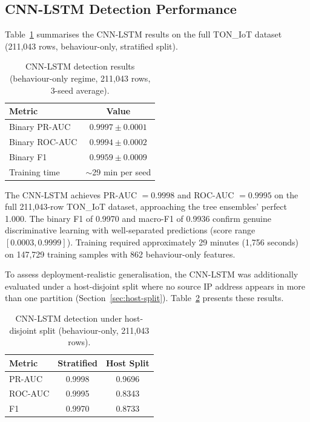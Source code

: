 \documentclass[12pt,a4paper]{report}
\begin{document}
\subsection{CNN-LSTM Detection Performance}
\label{sec:cnnlstm-detection}

Table~\ref{tab:cnnlstm} summarises the CNN-LSTM results on the full TON\_IoT dataset (211,043 rows, behaviour-only, stratified split).

\begin{table}[H]
\centering
\caption{CNN-LSTM detection results (behaviour-only regime, 211,043 rows, 3-seed average).}
\label{tab:cnnlstm}
\begin{tabular}{lc}
\toprule
\textbf{Metric} & \textbf{Value} \\
\midrule
Binary PR-AUC & $0.9997 \pm 0.0001$ \\
Binary ROC-AUC & $0.9994 \pm 0.0002$ \\
Binary F1 & $0.9959 \pm 0.0009$ \\
Training time & $\sim$29 min per seed \\
\bottomrule
\end{tabular}
\end{table}

The CNN-LSTM achieves PR-AUC $= 0.9998$ and ROC-AUC $= 0.9995$ on the full 211,043-row TON\_IoT dataset, approaching the tree ensembles' perfect 1.000. The binary F1 of 0.9970 and macro-F1 of 0.9936 confirm genuine discriminative learning with well-separated predictions (score range $[0.0003, 0.9999]$). Training required approximately 29 minutes (1,756 seconds) on 147,729 training samples with 862 behaviour-only features.

To assess deployment-realistic generalisation, the CNN-LSTM was additionally evaluated under a host-disjoint split where no source IP address appears in more than one partition (Section~\ref{sec:host-split}). Table~\ref{tab:cnnlstm-host} presents these results.

\begin{table}[H]
\centering
\caption{CNN-LSTM detection under host-disjoint split (behaviour-only, 211,043 rows).}
\label{tab:cnnlstm-host}
\begin{tabular}{lcc}
\toprule
\textbf{Metric} & \textbf{Stratified} & \textbf{Host Split} \\
\midrule
PR-AUC & 0.9998 & 0.9696 \\
ROC-AUC & 0.9995 & 0.8343 \\
F1 & 0.9970 & 0.8733 \\
\bottomrule
\end{tabular}
\end{table}
\end{document}
